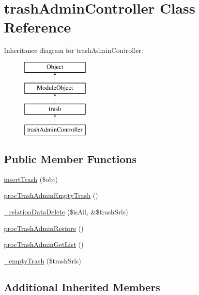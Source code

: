 \hypertarget{classtrashAdminController}{\section{trash\-Admin\-Controller Class Reference}
\label{classtrashAdminController}
}
Inheritance diagram for trash\-Admin\-Controller\-:\begin{figure}[H]
\begin{center}
\leavevmode
\includegraphics[height=4.000000cm]{classtrashAdminController}
\end{center}
\end{figure}
\subsection*{Public Member Functions}
\begin{DoxyCompactItemize}
\item 
\hyperlink{classtrashAdminController_af1c07b97582130b96d72fa6d397d7740}{insert\-Trash} (\$obj)
\item 
\hyperlink{classtrashAdminController_a15977bd5e3c92b5b7b9218dee97a9ed0}{proc\-Trash\-Admin\-Empty\-Trash} ()
\item 
\hyperlink{classtrashAdminController_a6f402d0113009b914de8665786d95ae9}{\-\_\-relation\-Data\-Delete} (\$is\-All, \&\$trash\-Srls)
\item 
\hyperlink{classtrashAdminController_a5bd5aea6170e91d725b7f758480aba38}{proc\-Trash\-Admin\-Restore} ()
\item 
\hyperlink{classtrashAdminController_af522d8b4cd292cce44ea6b1cedfcf0c1}{proc\-Trash\-Admin\-Get\-List} ()
\item 
\hyperlink{classtrashAdminController_adaff8ae03021995e529e1c8f6510ff24}{\-\_\-empty\-Trash} (\$trash\-Srls)
\end{DoxyCompactItemize}
\subsection*{Additional Inherited Members}


